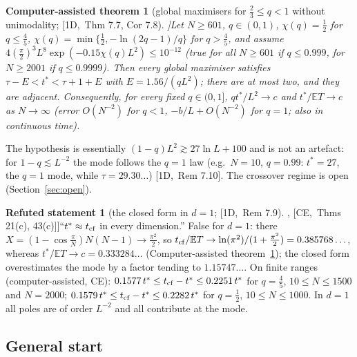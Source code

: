 \documentclass[10pt,a4paper]{article}
\theoremstyle{plain}
\newtheorem{catheorem}[theorem]{Computer-assisted theorem}
\theoremstyle{definition}
\newtheorem{refuted}[theorem]{Refuted statement}
\newcommand{\src}[2]{[\textsf{#1},~#2]}           %
\newcommand{\ONE}{\textsf{1D}}
\newcommand{\CER}{\textsf{CE}}
\newcommand{\E}{\mathbb{E}}
\begin{document}
\begin{catheorem}[global maximisers for $\frac23\le q<1$ without unimodality; \src{\ONE}{Thm 7.7, Cor 7.8}]\label{thm:1d-global}
Let $N\ge601$, $q\in(0,1)$, $\chi(q)=\frac12$ for $q\le\frac45$, $\chi(q)=\min\{\frac12,-\ln(2q-1)/q\}$ for $q>\frac45$, and assume $4(\frac\pi2)^3L^8\exp(-0.15\chi(q)L^2)\le10^{-12}$ (true for all $N\ge601$ if $q\le0.999$, for $N\ge2001$ if $q\le0.9999$). Then every global maximiser satisfies $\tau-E<t^*<\tau+1+E$ with $E=1.56/(qL^2)$; there are at most two, and they are adjacent. Consequently, for every fixed $q\in(0,1]$, $qt^*/L^2\to c$ and $t^*/\E T\to c$ as $N\to\infty$ (error $O(N^{-2})$ for $q<1$, $-b/L+O(N^{-2})$ for $q=1$; also in continuous time).
\end{catheorem}
The hypothesis is essentially $(1-q)L^2\gtrsim27\ln L+100$ and is not an artefact: for $1-q\lesssim L^{-2}$ the mode follows the $q=1$ law (e.g.\ $N=10$, $q=0.99$: $t^*=27$, the $q=1$ mode, while $\tau=29.30\ldots$) \src{\ONE}{Rem 7.10}. The crossover regime is open (Section~\ref{sec:open}).

\begin{refuted}[the closed form in $d=1$; \src{\ONE}{Rem 7.9}, \src{\CER}{Thms 21(c), 43(c)}]\label{ref:cf1d}
``$t^*\approx t_{\rm cf}$ in every dimension.'' False for $d=1$: there $X=(1-\cos\frac\pi N)N(N-1)\to\frac{\pi^2}2$, so $t_{\rm cf}/\E T\to\ln(\pi^2)/(1+\frac{\pi^2}2)=0.385768\ldots$, whereas $t^*/\E T\to c=0.333284\ldots$ (Computer-assisted theorem~\ref{thm:1d-global}); the closed form overestimates the mode by a factor tending to $1.15747\ldots$. On finite ranges (computer-assisted, \CER): $0.1577\,t^*\le t_{\rm cf}-t^*\le0.2251\,t^*$ for $q=\frac45$, $10\le N\le1500$ and $N=2000$; $0.1579\,t^*\le t_{\rm cf}-t^*\le0.2282\,t^*$ for $q=\frac12$, $10\le N\le1000$. In $d=1$ all poles are of order $L^{-2}$ and all contribute at the mode.
\end{refuted}

\subsection{General start}
\end{document}
